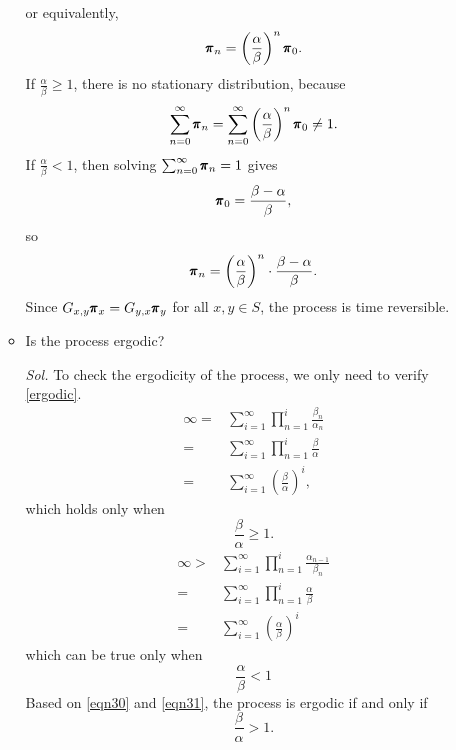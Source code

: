 \begin{enumerate}
\begin{itemize}
\begin{equation*}
        \end{equation*}
        or equivalently,
        \begin{equation*}
            \pmb{\pi}_n = \left( \frac{\alpha}{\beta} \right)^n \pmb{\pi}_0.
        \end{equation*}
        If $\frac{\alpha}{\beta} \ge 1$, there is no stationary distribution, because 
        \begin{equation*}
            \sum_{n = 0}^\infty \pmb{\pi}_n = \sum_{n = 0}^\infty \left( \frac{\alpha}{\beta} \right)^n \pmb{\pi}_0 \neq 1.
        \end{equation*}
        If $\frac{\alpha}{\beta} < 1$, then solving $\sum_{n = 0}^\infty \pmb{\pi}_n = 1$ gives 
        \begin{equation*}
            \pmb{\pi}_0 = \frac{\beta - \alpha}{\beta},
        \end{equation*}
        so 
        \begin{equation*}
            \pmb{\pi}_n = \left( \frac{\alpha}{\beta} \right)^n \cdot \frac{\beta - \alpha}{\beta}.
        \end{equation*}
        Since $G_{x,y} \pmb{\pi}_x = G_{y,x} \pmb{\pi}_y$ for all $x,y \in S$, the process is time reversible.

        \item Is the process ergodic?
        
        \textit{ Sol. } To check the ergodicity of the process, we only need to verify \eqref{ergodic}.
        \begin{align*}
            \infty = & \sum_{i=1}^\infty \prod_{n=1}^i \frac{\beta_n}{\alpha_n} \\ 
            = & \sum_{i = 1}^\infty \prod_{n=1}^i \frac{\beta}{\alpha} \\ 
            = & \sum_{i = 1}^\infty \left( \frac{\beta}{\alpha} \right)^i,
        \end{align*}
        which holds only when 
        \begin{equation}\label{eqn30}
            \frac{\beta}{\alpha}  \ge 1.
        \end{equation}
        \begin{align*}
            \infty > & \sum_{i=1}^\infty \prod_{n=1}^i \frac{\alpha_{n-1}}{\beta_n}\\ 
            = & \sum_{i=1}^\infty \prod_{n=1}^i \frac{\alpha}{\beta} \\ 
            = & \sum_{i=1}^\infty \left(\frac{\alpha}{\beta} \right)^i
        \end{align*}
        which can be true only when 
        \begin{equation*}\label{eqn31}
            \frac{\alpha}{\beta} < 1
        \end{equation*}
        Based on \eqref{eqn30} and \eqref{eqn31}, the process is ergodic if and only if 
        \begin{equation*}
            \frac{\beta}{\alpha} > 1.
        \end{equation*}
    \end{itemize}


\end{enumerate}
